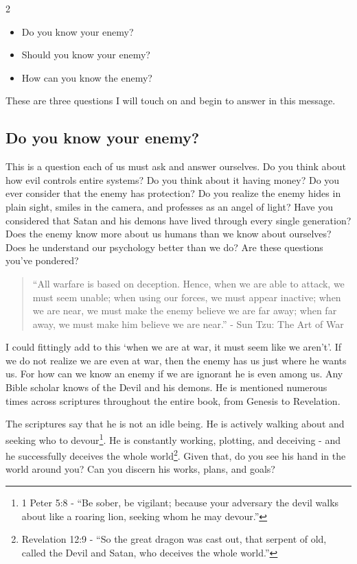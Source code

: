 \documentclass[10pt]{article}
\begin{document}
\begin{multicols}{2}
\begin{itemize}[noitemsep]
\item Do you know your enemy? 
\item Should you know your enemy? 
\item How can you know the enemy?
\end{itemize}

These are three questions I will touch on and begin to answer in this message.

\subsection*{Do you know your enemy?}

This is a question each of us must ask and answer ourselves. Do you think about how evil controls entire systems? Do you think about it having money? Do you ever consider that the enemy has protection? Do you realize the enemy hides in plain sight, smiles in the camera, and professes as an angel of light? Have you considered that Satan and his demons have lived through every single generation? Does the enemy know more about us humans than we know about ourselves? Does he understand our psychology better than we do? Are these questions you've pondered?

\begin{quotation}
``All warfare is based on deception. Hence, when we are able to attack, we must seem unable; when using our forces, we must appear inactive; when we are near, we must make the enemy believe we are far away; when far away, we must make him believe we are near.'' - Sun Tzu: The Art of War
\end{quotation}

I could fittingly add to this `when we are at war, it must seem like we aren't'. If we do not realize we are even at war, then the enemy has us just where he wants us. For how can we know an enemy if we are ignorant he is even among us. Any Bible scholar knows of the Devil and his demons. He is mentioned numerous times across scriptures throughout the entire book, from Genesis to Revelation.

The scriptures say that he is not an idle being. He is actively walking about and seeking who to devour\footnote{1 Peter 5:8 - ``Be sober, be vigilant; because your adversary the devil walks about like a roaring lion, seeking whom he may devour.''}. He is constantly working, plotting, and deceiving - and he successfully deceives the whole world\footnote{Revelation 12:9 - ``So the great dragon was cast out, that serpent of old, called the Devil and Satan, who deceives the whole world.''}. Given that, do you see his hand in the world around you? Can you discern his works, plans, and goals?


\end{multicols}
\end{document}
